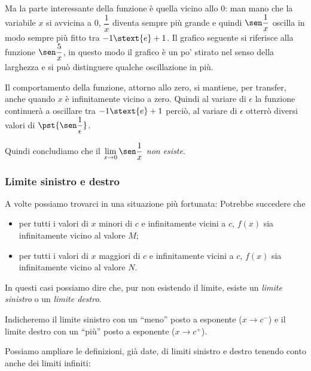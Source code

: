 Ma la parte interessante della funzione è quella vicino allo \(0\):
man mano che la variabile \(x\) si avvicina a \(0\), \(\dfrac{1}{x}\) diventa 
sempre più grande e quindi \(\sen \dfrac{1}{x}\) oscilla in modo sempre più 
fitto tra \(-1 \stext{e} +1\).
Il grafico seguente si riferisce alla funzione \(\sen \dfrac{5}{x}\), in 
questo modo il grafico è un po' stirato nel senso della larghezza e si può 
distinguere qualche oscillazione in più.
\begin{center} \limitesinunosux \end{center}
Il comportamento della funzione, attorno allo zero, si mantiene, per 
transfer, anche quando \(x\) è infinitamente vicino a zero.
Quindi al variare di \(\epsilon\) la funzione continuerà a oscillare tra 
\(-1 \stext{e} +1\) perciò, al variare di \(\epsilon\) otterrò diversi valori 
di \(\pst{\sen \dfrac{1}{\epsilon}}\).

Quindi concludiamo che il 
\(\displaystyle \lim_{x \to 0}\sen \dfrac{1}{x}\) \emph{non esiste}.

\subsubsection{Limite sinistro e destro}
A volte possiamo trovarci in una situazione più fortunata:
Potrebbe succedere che 
\begin{itemize} [nosep]
\item 
per tutti i valori di \(x\) minori di \(c\) e infinitamente vicini a \(c\), 
\(f(x)\) sia infinitamente vicino al valore \(M\);
\item 
per tutti i valori di \(x\) maggiori di \(c\) e infinitamente vicini a \(c\), 
\(f(x)\) sia infinitamente vicino al valore \(N\). 
\end{itemize}

In questi casi possiamo dire che, pur non esistendo il limite, esiste un 
\emph{limite sinistro} o un \emph{limite destro}.

Indicheremo il limite sinistro con un ``meno'' posto a esponente 
(\(x \to c^-\)) 
e il limite destro con un ``più'' posto a esponente (\(x \to c^+\)).

Possiamo ampliare le definizioni, già date,  di limiti sinistro e destro 
tenendo conto anche dei limiti infiniti:

